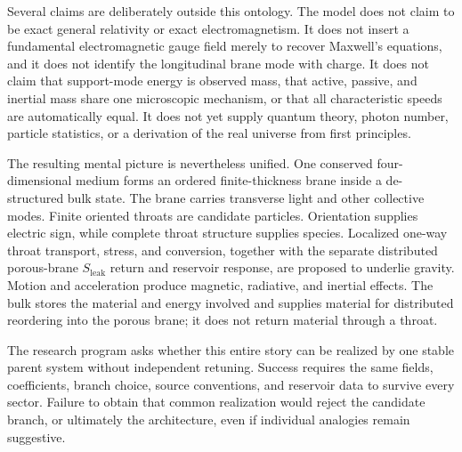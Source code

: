 Several claims are deliberately outside this ontology. The model does not claim
to be exact general relativity or exact electromagnetism. It does not insert a
fundamental electromagnetic gauge field merely to recover Maxwell's equations,
and it does not identify the longitudinal brane mode with charge. It does not
claim that support-mode energy is observed mass, that active, passive, and
inertial mass share one microscopic mechanism, or that all characteristic speeds
are automatically equal. It does not yet supply quantum theory, photon number,
particle statistics, or a derivation of the real universe from first principles.

The resulting mental picture is nevertheless unified. One conserved
four-dimensional medium forms an ordered finite-thickness brane inside a
de-structured bulk state. The brane carries transverse light and other collective
modes. Finite oriented throats are candidate particles. Orientation supplies
electric sign, while complete throat structure supplies species. Localized
one-way throat transport, stress, and conversion, together with the separate
distributed porous-brane \(S_{\mathrm{leak}}\) return and reservoir response,
are proposed to underlie gravity. Motion and acceleration produce magnetic,
radiative, and inertial effects. The bulk stores the material and energy
involved and supplies material for distributed reordering into the porous brane;
it does not return material through a throat.

The research program asks whether this entire story can be realized by one
stable parent system without independent retuning. Success requires the same
fields, coefficients, branch choice, source conventions, and reservoir data to
survive every sector. Failure to obtain that common realization would reject the
candidate branch, or ultimately the architecture, even if individual analogies
remain suggestive.
